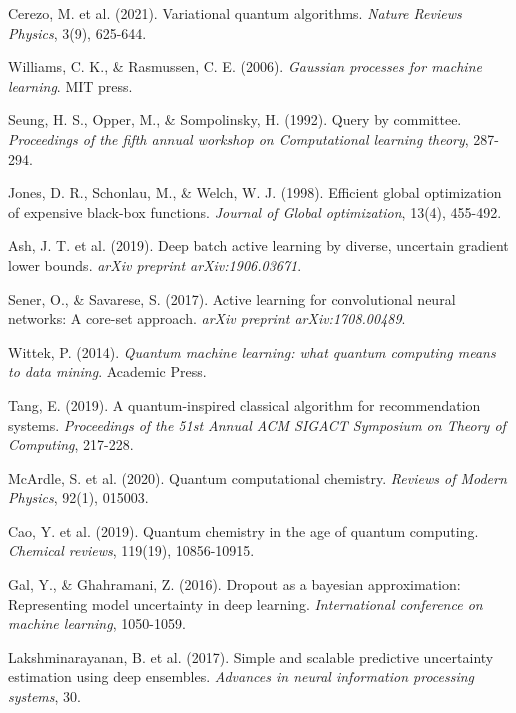 \documentclass[twocolumn]{article}
\begin{document}
\begin{thebibliography}{20}
Cerezo, M. et al. (2021). Variational quantum algorithms. \textit{Nature Reviews Physics}, 3(9), 625-644.

Williams, C. K., \& Rasmussen, C. E. (2006). \textit{Gaussian processes for machine learning}. MIT press.

Seung, H. S., Opper, M., \& Sompolinsky, H. (1992). Query by committee. \textit{Proceedings of the fifth annual workshop on Computational learning theory}, 287-294.

Jones, D. R., Schonlau, M., \& Welch, W. J. (1998). Efficient global optimization of expensive black-box functions. \textit{Journal of Global optimization}, 13(4), 455-492.

Ash, J. T. et al. (2019). Deep batch active learning by diverse, uncertain gradient lower bounds. \textit{arXiv preprint arXiv:1906.03671}.

Sener, O., \& Savarese, S. (2017). Active learning for convolutional neural networks: A core-set approach. \textit{arXiv preprint arXiv:1708.00489}.

Wittek, P. (2014). \textit{Quantum machine learning: what quantum computing means to data mining}. Academic Press.

Tang, E. (2019). A quantum-inspired classical algorithm for recommendation systems. \textit{Proceedings of the 51st Annual ACM SIGACT Symposium on Theory of Computing}, 217-228.

McArdle, S. et al. (2020). Quantum computational chemistry. \textit{Reviews of Modern Physics}, 92(1), 015003.

Cao, Y. et al. (2019). Quantum chemistry in the age of quantum computing. \textit{Chemical reviews}, 119(19), 10856-10915.

Gal, Y., \& Ghahramani, Z. (2016). Dropout as a bayesian approximation: Representing model uncertainty in deep learning. \textit{International conference on machine learning}, 1050-1059.

Lakshminarayanan, B. et al. (2017). Simple and scalable predictive uncertainty estimation using deep ensembles. \textit{Advances in neural information processing systems}, 30.

\end{thebibliography}
\end{document}
